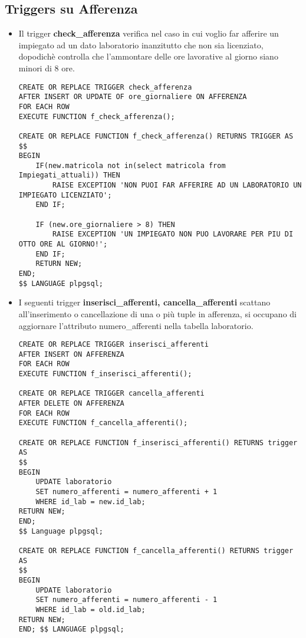 \subsection{Triggers su Afferenza}
\begin{itemize}
    
\normalsize
\item Il trigger \textbf{check\_afferenza} verifica nel caso in cui voglio far afferire un impiegato ad un dato laboratorio inanzitutto che non sia licenziato, dopodichè controlla che l'ammontare delle ore lavorative al giorno siano minori di 8 ore.
\scriptsize
\begin{lstlisting}
CREATE OR REPLACE TRIGGER check_afferenza
AFTER INSERT OR UPDATE OF ore_giornaliere ON AFFERENZA
FOR EACH ROW
EXECUTE FUNCTION f_check_afferenza();

CREATE OR REPLACE FUNCTION f_check_afferenza() RETURNS TRIGGER AS
$$
BEGIN
	IF(new.matricola not in(select matricola from Impiegati_attuali)) THEN
		RAISE EXCEPTION 'NON PUOI FAR AFFERIRE AD UN LABORATORIO UN IMPIEGATO LICENZIATO';
	END IF;
	
	IF (new.ore_giornaliere > 8) THEN
		RAISE EXCEPTION 'UN IMPIEGATO NON PUO LAVORARE PER PIU DI OTTO ORE AL GIORNO!';
	END IF;
	RETURN NEW;
END;
$$ LANGUAGE plpgsql;
\end{lstlisting}

\normalsize
\item I seguenti trigger \textbf{inserisci\_afferenti, cancella\_afferenti} scattano all'inserimento o cancellazione di una o più tuple in afferenza, si occupano di aggiornare l'attributo numero\_afferenti nella tabella laboratorio.
\scriptsize
\begin{lstlisting}
CREATE OR REPLACE TRIGGER inserisci_afferenti
AFTER INSERT ON AFFERENZA
FOR EACH ROW
EXECUTE FUNCTION f_inserisci_afferenti();

CREATE OR REPLACE TRIGGER cancella_afferenti
AFTER DELETE ON AFFERENZA
FOR EACH ROW
EXECUTE FUNCTION f_cancella_afferenti();

CREATE OR REPLACE FUNCTION f_inserisci_afferenti() RETURNS trigger AS 
$$
BEGIN
	UPDATE laboratorio
	SET numero_afferenti = numero_afferenti + 1
	WHERE id_lab = new.id_lab;
RETURN NEW;
END;
$$ Language plpgsql;

CREATE OR REPLACE FUNCTION f_cancella_afferenti() RETURNS trigger AS
$$
BEGIN
	UPDATE laboratorio
	SET numero_afferenti = numero_afferenti - 1
	WHERE id_lab = old.id_lab;
RETURN NEW;
END; $$ LANGUAGE plpgsql;
\end{lstlisting}


\end{itemize}
\newpage




